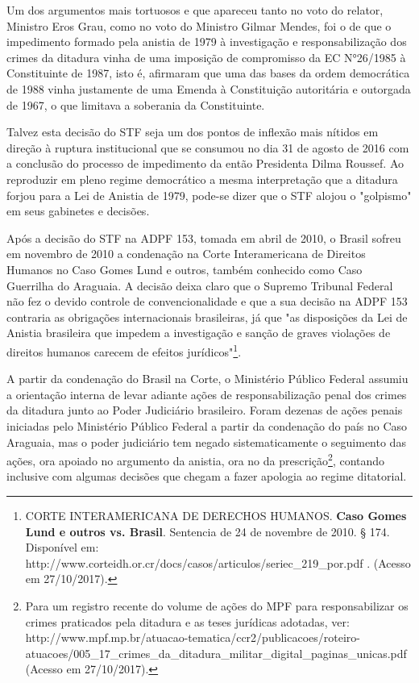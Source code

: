 Um dos argumentos mais tortuosos e que apareceu tanto no voto do
relator, Ministro Eros Grau, como no voto do Ministro Gilmar Mendes, foi
o de que o impedimento formado pela anistia de 1979 à investigação e
responsabilização dos crimes da ditadura vinha de uma imposição de
compromisso da EC N°26/1985 à Constituinte de 1987, isto é, afirmaram
que uma das bases da ordem democrática de 1988 vinha justamente de uma
Emenda à Constituição autoritária e outorgada de 1967, o que limitava a
soberania da Constituinte.

Talvez esta decisão do STF seja um dos pontos de inflexão mais nítidos
em direção à ruptura institucional que se consumou no dia 31 de agosto
de 2016 com a conclusão do processo de impedimento da então Presidenta
Dilma Roussef. Ao reproduzir em pleno regime democrático a mesma
interpretação que a ditadura forjou para a Lei de Anistia de 1979,
pode-se dizer que o STF alojou o "golpismo" em seus gabinetes e
decisões.

Após a decisão do STF na ADPF 153, tomada em abril de 2010, o Brasil
sofreu em novembro de 2010 a condenação na Corte Interamericana de
Direitos Humanos no Caso Gomes Lund e outros, também conhecido como Caso
Guerrilha do Araguaia. A decisão deixa claro que o Supremo Tribunal
Federal não fez o devido controle de convencionalidade e que a sua
decisão na ADPF 153 contraria as obrigações internacionais brasileiras,
já que "as disposições da Lei de Anistia brasileira que impedem a
investigação e sanção de graves violações de direitos humanos carecem de
efeitos jurídicos"\footnote{CORTE INTERAMERICANA DE DERECHOS HUMANOS.
  \textbf{Caso Gomes Lund e outros vs. Brasil}. Sentencia de 24 de
  novembre de 2010. § 174. Disponível em:
  http://www.corteidh.or.cr/docs/casos/articulos/seriec\_219\_por.pdf .
  (Acesso em 27/10/2017).}.

A partir da condenação do Brasil na Corte, o Ministério Público Federal
assumiu a orientação interna de levar adiante ações de responsabilização
penal dos crimes da ditadura junto ao Poder Judiciário brasileiro. Foram
dezenas de ações penais iniciadas pelo Ministério Público Federal a
partir da condenação do país no Caso Araguaia, mas o poder judiciário
tem negado sistematicamente o seguimento das ações, ora apoiado no
argumento da anistia, ora no da prescrição\footnote{Para um registro
  recente do volume de ações do MPF para responsabilizar os crimes
  praticados pela ditadura e as teses jurídicas adotadas, ver:
  http://www.mpf.mp.br/atuacao-tematica/ccr2/publicacoes/roteiro-atuacoes/005\_17\_crimes\_da\_ditadura\_militar\_digital\_paginas\_unicas.pdf
  (Acesso em 27/10/2017).}, contando inclusive com algumas decisões que
chegam a fazer apologia ao regime ditatorial.

